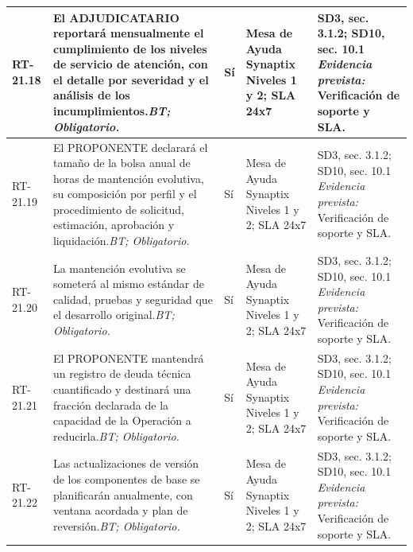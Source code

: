 \begin{paginaHorizontalSynaptix}
\begin{longtable}{|L{0.09\AnchoMatrizTDoce}|L{0.385\AnchoMatrizTDoce}|L{0.065\AnchoMatrizTDoce}|L{0.18\AnchoMatrizTDoce}|L{0.28\AnchoMatrizTDoce}|}
RT-\allowbreak{}21.\allowbreak{}18 &
El ADJUDICATARIO reportará mensualmente el cumplimiento de los niveles de servicio de atención, con el detalle por severidad y el análisis de los incumplimientos.\newline\textit{BT; Obligatorio.} &
Sí &
Mesa de Ayuda Synaptix Niveles 1 y 2; SLA 24x7 &
SD3, sec. 3.1.2; SD10, sec. 10.1 \newline\textit{Evidencia prevista:} Verificación de soporte y SLA. \\ \hline

RT-\allowbreak{}21.\allowbreak{}19 &
El PROPONENTE declarará el tamaño de la bolsa anual de horas de mantención evolutiva, su composición por perfil y el procedimiento de solicitud, estimación, aprobación y liquidación.\newline\textit{BT; Obligatorio.} &
Sí &
Mesa de Ayuda Synaptix Niveles 1 y 2; SLA 24x7 &
SD3, sec. 3.1.2; SD10, sec. 10.1 \newline\textit{Evidencia prevista:} Verificación de soporte y SLA. \\ \hline

RT-\allowbreak{}21.\allowbreak{}20 &
La mantención evolutiva se someterá al mismo estándar de calidad, pruebas y seguridad que el desarrollo original.\newline\textit{BT; Obligatorio.} &
Sí &
Mesa de Ayuda Synaptix Niveles 1 y 2; SLA 24x7 &
SD3, sec. 3.1.2; SD10, sec. 10.1 \newline\textit{Evidencia prevista:} Verificación de soporte y SLA. \\ \hline

RT-\allowbreak{}21.\allowbreak{}21 &
El PROPONENTE mantendrá un registro de deuda técnica cuantificado y destinará una fracción declarada de la capacidad de la Operación a reducirla.\newline\textit{BT; Obligatorio.} &
Sí &
Mesa de Ayuda Synaptix Niveles 1 y 2; SLA 24x7 &
SD3, sec. 3.1.2; SD10, sec. 10.1 \newline\textit{Evidencia prevista:} Verificación de soporte y SLA. \\ \hline

RT-\allowbreak{}21.\allowbreak{}22 &
Las actualizaciones de versión de los componentes de base se planificarán anualmente, con ventana acordada y plan de reversión.\newline\textit{BT; Obligatorio.} &
Sí &
Mesa de Ayuda Synaptix Niveles 1 y 2; SLA 24x7 &
SD3, sec. 3.1.2; SD10, sec. 10.1 \newline\textit{Evidencia prevista:} Verificación de soporte y SLA. \\ \hline


\end{longtable}
\end{paginaHorizontalSynaptix}
